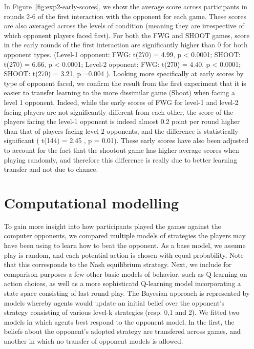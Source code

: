 \documentclass[man,floatsintext]{apa6}
\begin{document}
In Figure~\ref{fig:exp2-early-scores}, we show the average score across participants in rounds 2-6 of the first interaction with the opponent for each game. These scores are also averaged across the levels of condition (meaning they are irrespective of which opponent players faced first). For both the FWG and SHOOT games, score in the early rounds of the first interaction are significantly higher than 0 for both opponent types. (Level-1 opponent: FWG: t(270) = 4.99, p \textless{} 0.0001; SHOOT: t(270) = 6.66, p \textless{} 0.0001; Level-2 opponent: FWG: t(270) = 4.40, p \textless{} 0.0001; SHOOT: t(270) = 3.21, p =0.004 ). Looking more specifically at early scores by type of opponent faced, we confirm the result from the first experiment that it is easier to transfer learning to the more dissimilar game (Shoot) when facing a level 1 opponent. Indeed, while the early scores of FWG for level-1 and level-2 facing players are not significantly different from each other, the score of the players facing the level-1 opponent is indeed almost 0.2 point per round higher than that of players facing level-2 opponents, and the difference is statistically significant ( t(144) = 2.45 , p = 0.01). These early scores have also been adjusted to account for the fact that the shootout game has higher average scores when playing randomly, and therefore this difference is really due to better learning transfer and not due to chance.

\newpage

\hypertarget{computational-modelling}{%
\section{Computational modelling}\label{computational-modelling}}

To gain more insight into how participants played the games against the computer opponents, we compared multiple models of strategies the players may have been using to learn how to beat the opponent. As a base model, we assume play is random, and each potential action is chosen with equal probability. Note that this corresponds to the Nash equilibrium strategy. Next, we include for comparison purposes a few other basic models of behavior, such as Q-learning on action choices, as well as a more sophisticatd Q-learning model incorporating a state space consisting of last round play. The Bayesian approach is represented by models whereby agents would update an initial belief over the opponent's strategy consisting of various level-k strategies (resp. 0,1 and 2). We fitted two models in which agents best respond to the opponent model. In the first, the beliefs about the opponent's adopted strategy are transfered across games, and another in which no transfer of opponent models is allowed.
\end{document}
